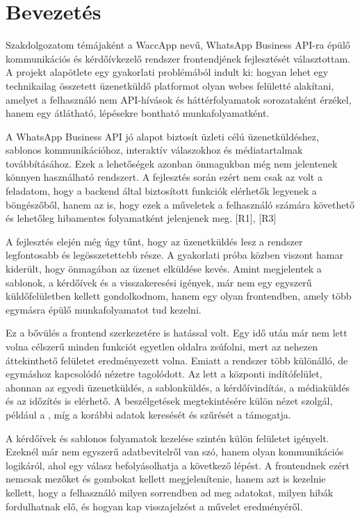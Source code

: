 \chapter{Bevezetés}
Szakdolgozatom témájaként a WaccApp nevű, WhatsApp Business API-ra épülő kommunikációs és kérdőívkezelő rendszer frontendjének fejlesztését választottam. A projekt alapötlete egy gyakorlati problémából indult ki: hogyan lehet egy technikailag összetett üzenetküldő platformot olyan webes felületté alakítani, amelyet a felhasználó nem API-hívások és háttérfolyamatok sorozataként érzékel, hanem egy átlátható, lépésekre bontható munkafolyamatként. 

A WhatsApp Business API jó alapot biztosít üzleti célú üzenetküldéshez, sablonos kommunikációhoz, interaktív válaszokhoz és médiatartalmak továbbításához. Ezek a lehetőségek azonban önmagukban még nem jelentenek könnyen használható rendszert. A fejlesztés során ezért nem csak az volt a feladatom, hogy a backend által biztosított funkciók elérhetők legyenek a böngészőből, hanem az is, hogy ezek a műveletek a felhasználó számára követhető és lehetőleg hibamentes folyamatként jelenjenek meg. [R1], [R3] 

A fejlesztés elején még úgy tűnt, hogy az üzenetküldés lesz a rendszer legfontosabb és legösszetettebb része. A gyakorlati próba közben viszont hamar kiderült, hogy önmagában az üzenet elküldése kevés. Amint megjelentek a sablonok, a kérdőívek és a visszakeresési igények, már nem egy egyszerű küldőfelületben kellett gondolkodnom, hanem egy olyan frontendben, amely több egymásra épülő munkafolyamatot tud kezelni.

Ez a bővülés a frontend szerkezetére is hatással volt. Egy idő után már nem lett volna célszerű minden funkciót egyetlen oldalra zsúfolni, mert az nehezen áttekinthető felületet eredményezett volna. Emiatt a rendszer több különálló, de egymáshoz kapcsolódó nézetre tagolódott. Az  lett a központi indítófelület, ahonnan az egyedi üzenetküldés, a sablonküldés, a kérdőívindítás, a médiaküldés és az időzítés is elérhető. A beszélgetések megtekintésére külön nézet szolgál, például a , míg a korábbi adatok keresését és szűrését a  támogatja. 

A kérdőívek és sablonos folyamatok kezelése szintén külön felületet igényelt. Ezeknél már nem egyszerű adatbevitelről van szó, hanem olyan kommunikációs logikáról, ahol egy válasz befolyásolhatja a következő lépést. A frontendnek ezért nemcsak mezőket és gombokat kellett megjelenítenie, hanem azt is kezelnie kellett, hogy a felhasználó milyen sorrendben ad meg adatokat, milyen hibák fordulhatnak elő, és hogyan kap visszajelzést a művelet eredményéről. 

